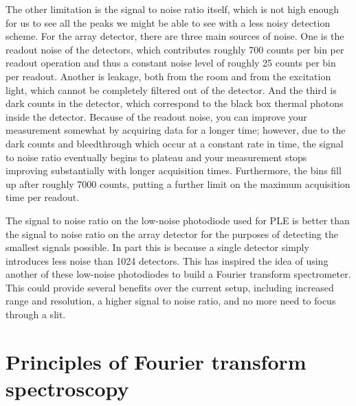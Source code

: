 \documentclass[12pt]{puthesis}
\begin{document}
The other limitation is the signal to noise ratio itself, which is not high enough for us to see all the peaks we might be able to see with a less noisy detection scheme. For the array detector, there are three main sources of noise. One is the readout noise of the detectors, which contributes roughly 700 counts per bin per readout operation and thus a constant noise level of roughly 25 counts per bin per readout. Another is leakage, both from the room and from the excitation light, which cannot be completely filtered out of the detector. And the third is dark counts in the detector, which correspond to the black box thermal photons inside the detector. Because of the readout noise, you can improve your measurement somewhat by acquiring data for a longer time; however, due to the dark counts and bleedthrough which occur at a constant rate in time, the signal to noise ratio eventually begins to plateau and your measurement stops improving substantially with longer acquisition times. Furthermore, the bins fill up after roughly 7000 counts, putting a further limit on the maximum acquisition time per readout.

The signal to noise ratio on the low-noise photodiode used for PLE is better than the signal to noise ratio on the array detector for the purposes of detecting the smallest signals possible. In part this is because a single detector simply introduces less noise than 1024 detectors. This has inspired the idea of using another of these low-noise photodiodes to build a Fourier transform spectrometer. This could provide several benefits over the current setup, including increased range and resolution, a higher signal to noise ratio, and no more need to focus through a slit. 





\section{Principles of Fourier transform spectroscopy}
\end{document}
